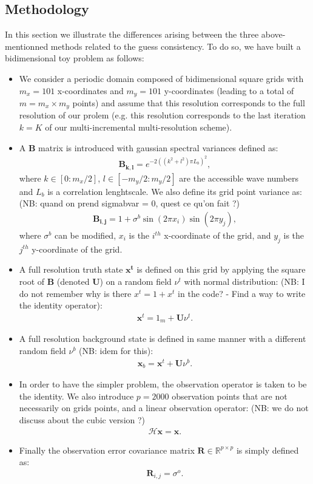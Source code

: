 \documentclass[npg, manuscript]{copernicus}
\begin{document}
\subsection{Methodology}
In this section we illustrate the differences arising between the three above-mentionned methods related to the guess consistency. To do so, we have built a bidimensional toy problem as follows:
\begin{itemize}
 \item We consider a periodic domain composed of bidimensional square grids with $m_x=101$ x-coordinates and $m_y=101$ y-coordinates (leading to a total of $m = m_x \times m_y$ points) and assume that this resolution corresponds to the full resolution of our prolem (e.g. this resolution corresponds to the last iteration $k=K$ of our multi-incremental multi-resolution scheme).
 \item A $\mathbf{B}$ matrix is introduced with gaussian spectral variances defined as:
 \begin{align}
  \mathbf{B_{k,l}} = e^{-2((k^2 + l^2)\pi L_b)^2}, 
 \end{align}
 where $k \in [0:m_x/2]$, $l \in [-m_y/2:m_y/2]$ are the accessible wave numbers and $L_b$ is a correlation lenghtscale.
 We also define its grid point variance as:
 (NB: quand on prend sigmabvar = 0, quest ce qu'on fait ?)
 \begin{align}
 \mathbf{B_{i,j}} = 1 + \sigma^b \sin(2\pi x_i) \sin(2\pi y_j),  
 \end{align}
where $\sigma^b$ can be modified, $x_i$ is the $i^{th}$ x-coordinate of the grid, and $y_j$ is the $j^{th}$ y-coordinate of the grid.
 \item A full resolution truth state $\mathbf{x^t}$ is defined on this grid by applying the square root of $\mathbf{B}$ (denoted $\mathbf{U}$) on a random field $\nu^{t}$ with normal distribution: (NB: I do not remember why is there $x^t = 1+x^t$ in the code? - Find a way to write the identity operator):
 \begin{align}
 \mathbf{x}^t = 1_m + \mathbf{U}\nu^{t}.
 \end{align}
 \item A full resolution background state is defined in same manner with a different random field $\nu^{b}$ (NB: idem for this):
 \begin{align}
 \mathbf{x}_b=\mathbf{x}^t + \mathbf{U}\nu^{b}.
 \end{align}
 \item In order to have the simpler problem, the observation operator is taken to be the identity. We also introduce $p=2000$ observation points that are not necessarily on grids points, and a linear observation operator: (NB: we do not discuss about the cubic version ?)
 \begin{align}
  \mathcal{H}\mathbf{x} = \mathbf{x}. 
 \end{align}
 \item Finally the observation error covariance matrix $\mathbf{R} \in \mathbb{R}^{p \times p}$ is simply defined as:
 \begin{align}
 \mathbf{R}_{i,j} = \sigma^o.
 \end{align}
\end{itemize}
\end{document}
